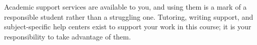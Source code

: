 Academic support services are available to you, and using them is a mark of a
responsible student rather than a struggling one. Tutoring, writing support, and
subject-specific help centers exist to support your work in this course; it is
your responsibility to take advantage of them.

